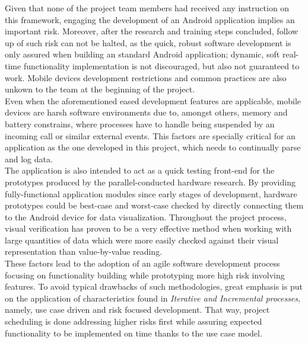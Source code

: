 	Given that none of the project team members had received any instruction on this framework, engaging the development of an Android application implies an important risk. Moreover, after the research and training steps concluded, follow up of such risk can not be halted, as the quick, robust software development is only assured when building an standard Android application; dynamic, soft real-time functionality implementation is not discouraged, but also not guaranteed to work.
	Mobile devices development restrictions and common practices are also unkown to the team at the beginning of the project.\\

	Even when the aforementioned eased development features are applicable, mobile devices are harsh software environments due to, amongst others, memory and battery constrains, where processes have to handle being suspended by an incoming call or similar external events. This factors are specially critical for an application as the one developed in this project, which needs to continually parse and log data.\\

	The application is also intended to act as a quick testing front-end for the prototypes produced by the parallel-conducted hardware research. By providing fully-functional application modules since early stages of development, hardware prototypes could be best-case and worst-case checked by directly connecting them to the Android device for data visualization. Throughout the project process, visual verification has proven to be a very effective method when working with large quantities of data which were more easily checked against their visual representation than value-by-value reading.\\

	These factors lead to the adoption of an agile software development process focusing on functionality building while prototyping more high risk involving features. To avoid typical drawbacks of such methodologies, great emphasis is put on the application of characteristics found in \textit{Iterative and Incremental processes}, namely, use case driven and risk focused development. That way, project scheduling is done addressing higher risks first while assuring expected functionality to be implemented on time thanks to the use case model.\\

